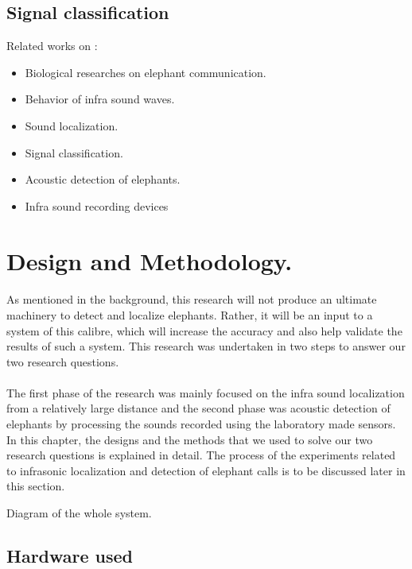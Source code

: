 \documentclass[12pt]{article}
\numberwithin{figure}{section}
\numberwithin{table}{section}
\begin{document}
\newpage
\subsection{Signal classification}

Related works on :
\begin{itemize}
  \item Biological researches on elephant communication. 
  \item Behavior of infra sound waves.
  \item Sound localization.
  \item Signal classification.
  \item Acoustic detection of elephants.
  \item Infra sound recording devices
\end{itemize}

\newpage
\section{Design and Methodology.}
\paragraph{}
As mentioned in the background, this research will not produce an ultimate machinery to detect and  localize elephants. Rather, it will be an input to a system of this calibre, which will increase the accuracy and also help validate the results of such a system. This research was undertaken in two steps to answer our two research questions.

\paragraph{}
The first phase of the research was mainly focused on the infra sound localization from a relatively large distance and the second phase was acoustic detection of elephants by processing the sounds recorded using the laboratory made sensors. In this chapter, the designs and the methods that we used to solve our two research questions is explained in detail. The process of the experiments related to infrasonic localization and detection of elephant calls is to be discussed later in this section.

Diagram of the whole system.


\subsection{Hardware used}
\end{document}
